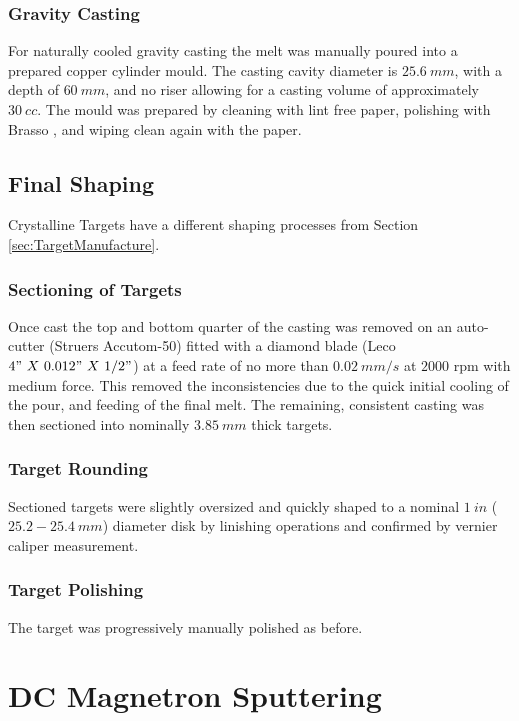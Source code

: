 \documentclass[a4paper,12pt,oneside]{report}%
\begin{document}
\subsubsection{Gravity Casting}
For naturally cooled gravity casting the melt was manually poured into a prepared copper cylinder mould. The casting cavity diameter is $25.6~ mm$, with a depth of $60~ mm$, and no riser allowing for a casting volume of approximately $30~ cc$. The mould was prepared by cleaning with lint free paper, polishing with Brasso \textcopyright, and wiping clean again with the paper.

\subsection{Final Shaping}
Crystalline Targets have a different shaping processes from Section \ref{sec:TargetManufacture}.

\subsubsection{Sectioning of Targets}
Once cast the top and bottom quarter of the casting was removed on an auto-cutter (Struers Accutom-50) fitted with a diamond blade (Leco $4"~ X~ 0.012"~ X~ 1/2"$) at a feed rate of no more than $0.02~ mm/s$ at $2000$ \acrshort{rpm} with medium force. This removed the inconsistencies due to the quick initial cooling of the pour, and feeding of the final melt. The remaining, consistent casting was then sectioned into nominally $3.85~ mm$ thick targets.

\subsubsection{Target Rounding}
Sectioned targets were slightly oversized and quickly shaped to a nominal $1~ in$ ($25.2 - 25.4~ mm$) diameter disk by linishing operations and confirmed by vernier caliper measurement.

\subsubsection{Target Polishing}
The target was progressively manually polished as before.

\clearpage

\section{DC Magnetron Sputtering}
\end{document}
